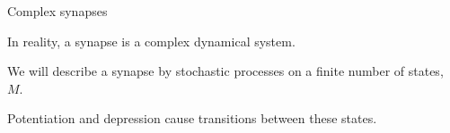 \documentclass[final,hyperref={pdfpagelabels=false,bookmarks=false}]{beamer}
\begin{document}
\begin{frame}{}
\begin{columns}[t]
\begin{column}{0.27\linewidth}
\begin{block}{Complex synapses}
%
 \begin{minipage}[t]{14.5cm}
   In reality, a synapse is a complex dynamical system.

   \vp We will describe a synapse by stochastic processes on a finite number of states, $M$.

   \vp Potentiation and depression cause transitions between these states.

   \vp
   \begin{center}
   \end{center}
 \end{minipage}
 \begin{minipage}[t]{15.5cm}
   \begin{center}
   \end{center}


\end{minipage}
\end{block}
\end{column}
\end{columns}
\end{frame}
\end{document}
